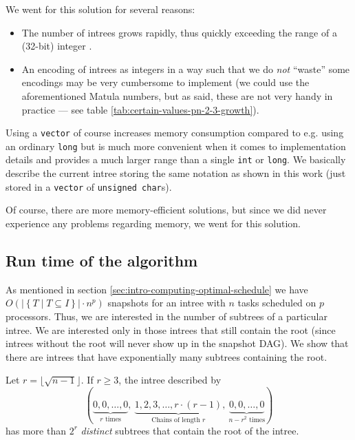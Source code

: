 We went for this solution for several reasons:

\begin{itemize}
\item The number of intrees grows rapidly, thus quickly exceeding the range of a (32-bit) integer \cite{oeisrootedtrees}.
\item An encoding of intrees as integers in a way such that we do \emph{not} ``waste'' some encodings may be very cumbersome to implement (we could use the aforementioned Matula numbers, but as said, these are not very handy in practice --- see table \ref{tab:certain-values-pn-2-3-growth}).
\end{itemize}

Using a \texttt{vector} of course increases memory consumption compared to e.g. using an ordinary \texttt{long} but is much more convenient when it comes to implementation details and provides a much larger range than a single \texttt{int} or \texttt{long}. We basically describe the current intree storing the same notation as shown in this work (just stored in a \texttt{vector} of \texttt{unsigned char}s).

Of course, there are more memory-efficient solutions, but since we did never experience any problems regarding memory, we went for this solution.

\subsection{Run time of the algorithm}
\label{sec:implementation-computing-all-schedules-runtime}

As mentioned in section \ref{sec:intro-computing-optimal-schedule} we have $O\left(|\left\{ T \mid T\subseteq I \right\}|\cdot n^p\right)$ snapshots for an intree with $n$ tasks scheduled on $p$ processors. Thus, we are interested in the number of subtrees of a particular intree. We are interested only in those intrees that still contain the root (since intrees without the root will never show up in the snapshot DAG). We show that there are intrees that have exponentially many subtrees containing the root.

\begin{theorem}
\label{thm:exponentially-many-subtrees}
Let $r=\lfloor\sqrt{n-1}\rfloor$. If $r\geq 3$, the intree described by
\begin{equation*}
  (
  \underbrace{0,0,\dots,0}_{r \text{ times}},
  \ 
  \underbrace{1,2,3,\dots, r \cdot (r-1)}_{\text{Chains of length } r},
  \ 
  \underbrace{0,0,\dots,0}_{n-r^2 \text{ times}}
  )
\end{equation*}
has more than $2^r$ \emph{distinct} subtrees that contain the root of the intree.
\end{theorem}

